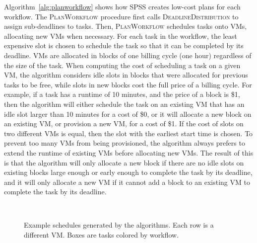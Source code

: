 \documentclass[conference]{IEEEtran}
\begin{document}
Algorithm~\ref{alg:planworkflow} shows how SPSS creates low-cost plans for each
workflow. The \textsc{PlanWorkflow} procedure first calls
\textsc{DeadlineDistribution} to assign sub-deadlines to tasks.
Then, \textsc{PlanWorkflow} schedules
tasks onto VMs, allocating new VMs when necessary. For each task in the
workflow, the least expensive slot is chosen to schedule the task so that it can
be completed by  its deadline. VMs are allocated in blocks of one billing cycle
(one hour) regardless of the size of the task. When computing the cost of
scheduling a task on a given VM, the algorithm considers idle slots in blocks
that were allocated for previous tasks to be free, while slots in new blocks
cost the full price of a billing cycle. 
For example, if a task has a runtime of
10 minutes, and the price of a block is \$1, then the algorithm will either
schedule the task on an existing VM that has an idle slot larger than 10
minutes for a cost of \$0, or it will allocate a new block on an existing VM,
or provision a new VM, for a cost of \$1. 
If the cost of slots on two different
VMs is equal, then the slot with the earliest start time is chosen. To prevent too
many VMs from being provisioned, the algorithm always prefers to extend the
runtime of existing VMs before allocating new VMs. The result of this is that
the algorithm will only allocate a new block if there are no idle slots on
existing blocks large enough or early enough to complete the task by its
deadline, and it will only allocate a new VM if it cannot add a block to an
existing VM to complete the task by its deadline.

\begin{figure}[tb] 
  \centering
  \\
  \caption[Example schedules generated by the algorithms]{Example
  schedules generated by the algorithms. Each row is a different
  VM. Boxes are tasks colored by workflow.}

\end{figure}
\end{document}
